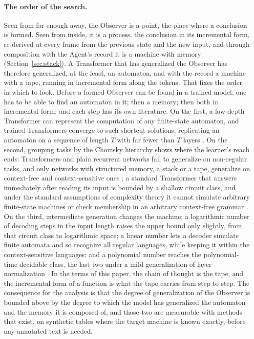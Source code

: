 \paragraph{The order of the search.}
Seen from far enough away, the Observer is a point, the place where a conclusion is formed. Seen from
inside, it is a process, the conclusion in its incremental form, re-derived at every frame from the
previous state and the new input, and through composition with the Agent's record it is a machine with
memory (Section~\ref{sec:stack}). A Transformer that has generalized the Observer has therefore
generalized, at the least, an automaton, and with the record a machine with a tape, running in
incremental form along the tokens. That fixes the order in which to look. Before a formed Observer can
be found in a trained model, one has to be able to find an automaton in it; then a memory; then both in
incremental form; and each step has its own literature. On the first, a low-depth Transformer can
represent the computation of any finite-state automaton, and trained Transformers converge to such
shortcut solutions, replicating an automaton on a sequence of length $T$ with far fewer than $T$
layers \citep{liu2023auto}. On the second, grouping tasks by the Chomsky hierarchy shows where the
learner's reach ends: Transformers and plain recurrent networks fail to generalize on non-regular
tasks, and only networks with structured memory, a stack or a tape, generalize on context-free and
context-sensitive ones \citep{deletang2022}; a standard Transformer that answers immediately after
reading its input is bounded by a shallow circuit class, and under the standard assumptions of
complexity theory it cannot simulate arbitrary finite-state machines or check membership in an
arbitrary context-free grammar \citep{merrill2023,merrill2024}. On the third, intermediate generation changes the machine: a logarithmic number
of decoding steps in the input length raises the upper bound only slightly, from that circuit class to
logarithmic space; a linear number lets a decoder simulate finite automata and so recognize all regular
languages, while keeping it within the context-sensitive languages; and a polynomial number reaches the
polynomial-time decidable class, the last two under a mild generalization of layer normalization
\citep{merrill2024}. In the terms of this paper, the chain of thought
is the tape, and the incremental form of a function is what the tape carries from step to step. The
consequence for the analysis is that the degree of generalization of the Observer is bounded above by
the degree to which the model has generalized the automaton and the memory it is composed of, and
those two are measurable with methods that exist, on synthetic tables where the target machine is
known exactly, before any annotated text is needed.

